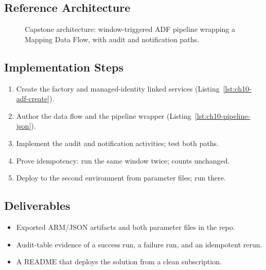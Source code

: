 \subsection*{Reference Architecture}
\begin{figure}[H]
    \centering
    \caption{Capstone architecture: window-triggered ADF pipeline wrapping a Mapping Data Flow, with audit and notification paths.}
    \label{fig:ch10-capstone-arch}
\end{figure}

\subsection*{Implementation Steps}
\begin{enumerate}
    \item Create the factory and managed-identity linked services (Listing~\ref{lst:ch10-adf-create}).
    \item Author the data flow and the pipeline wrapper (Listing~\ref{lst:ch10-pipeline-json}).
    \item Implement the audit and notification activities; test both paths.
    \item Prove idempotency: run the same window twice; counts unchanged.
    \item Deploy to the second environment from parameter files; run there.
\end{enumerate}

\subsection*{Deliverables}
\begin{itemize}
    \item Exported ARM/JSON artifacts and both parameter files in the repo.
    \item Audit-table evidence of a success run, a failure run, and an idempotent rerun.
    \item A README that deploys the solution from a clean subscription.
\end{itemize}

